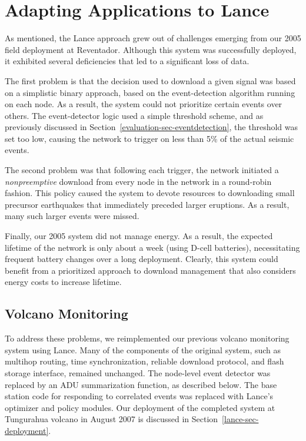 \section{Adapting Applications to Lance}
\label{lance-sec-adaptation}

As mentioned, the Lance approach grew out of challenges emerging from our
2005 field deployment at Reventador. Although this system was successfully
deployed, it exhibited several deficiencies that led to a significant loss of
data.

The first problem is that the decision used to download a given signal was
based on a simplistic binary approach, based on the event-detection algorithm
running on each node. As a result, the system could not prioritize certain
events over others. The event-detector logic used a simple threshold scheme,
and as previously discussed in Section~\ref{evaluation-sec-eventdetection},
the threshold was set too low, causing the network to trigger on less than
5\% of the actual seismic events.

The second problem was that following each trigger, the network initiated a
\textit{nonpreemptive} download from every node in the network in a
round-robin fashion. This policy caused the system to devote resources to
downloading small precursor earthquakes that immediately preceded larger
eruptions. As a result, many such larger events were missed.

Finally, our 2005 system did not manage energy. As a result, the expected
lifetime of the network is only about a week (using D-cell batteries),
necessitating frequent battery changes over a long deployment. Clearly, this
system could benefit from a prioritized approach to download management that
also considers energy costs to increase lifetime.

\subsection{Volcano Monitoring}
\label{lance-subsec-volcano}

To address these problems, we reimplemented our previous volcano monitoring
system using Lance. Many of the components of the original system, such as
multihop routing, time synchronization, reliable download protocol, and flash
storage interface, remained unchanged. The node-level event detector was
replaced by an ADU summarization function, as described below. The base
station code for responding to correlated events was replaced with Lance's
optimizer and policy modules. Our deployment of the completed system at
Tungurahua volcano in August 2007 is discussed in
Section~\ref{lance-sec-deployment}.

